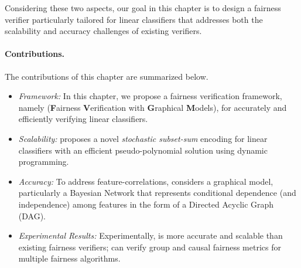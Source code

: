 	Considering these two aspects, our goal in this chapter is to design a fairness verifier particularly tailored for linear classifiers that addresses both the scalability and accuracy challenges of existing verifiers.
	
		
	
	\paragraph{Contributions.} The contributions of this chapter are summarized below.
	
	\begin{itemize}
		\item \textit{Framework:} In this chapter, we propose a fairness verification framework, namely {\fvgm} (\textbf{F}airness \textbf{V}erification with \textbf{G}raphical \textbf{M}odels), for accurately and efficiently verifying linear classifiers.
		\item \textit{Scalability:} {\fvgm} proposes a novel \textit{stochastic subset-sum} encoding for linear classifiers with an efficient pseudo-polynomial solution using dynamic programming.
		\item \textit{Accuracy:} To address feature-correlations, {\fvgm} considers a graphical model, particularly a Bayesian Network that represents conditional dependence (and independence) among features in the form of a Directed Acyclic Graph (DAG). 
		\item \textit{Experimental Results:}	Experimentally,  {\fvgm} is more accurate and scalable than existing fairness verifiers; {\fvgm} can verify group and causal fairness metrics for multiple fairness algorithms.
	\end{itemize}
 


